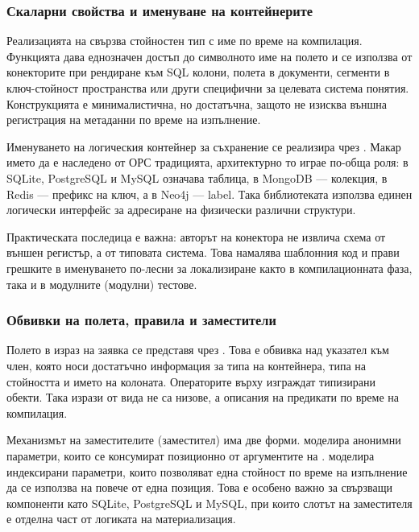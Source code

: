 \subsubsection{Скаларни свойства и именуване на контейнерите}

Реализацията на  свързва стойностен тип с име по време на компилация. Функцията  дава еднозначен достъп до символното име на полето и се използва от конекторите при рендиране към SQL колони, полета в документи, сегменти в ключ-стойност пространства или други специфични за целевата система понятия. Конструкцията е минималистична, но достатъчна, защото не изисква външна регистрация на метаданни по време на изпълнение.

Именуването на логическия контейнер за съхранение се реализира чрез . Макар името да е наследено от ОРС традицията, архитектурно то играе по-обща роля: в SQLite, PostgreSQL и MySQL означава таблица, в MongoDB --- колекция, в Redis --- префикс на ключ, а в Neo4j --- label. Така библиотеката използва единен логически интерфейс за адресиране на физически различни структури.

Практическата последица е важна: авторът на конектора не извлича схема от външен регистър, а от типовата система. Това намалява шаблонния код и прави грешките в именуването по-лесни за локализиране както в компилационната фаза, така и в модулните (модулни) тестове.

\subsubsection{Обвивки на полета, правила и заместители}

Полето в израз на заявка се представя чрез . Това е  обвивка над указател към член, която носи достатъчно информация за типа на контейнера, типа на стойността и името на колоната. Операторите върху  изграждат типизирани  обекти. Така изрази от вида  не са низове, а описания на предикати по време на компилация.

Механизмът на заместителите (заместител) има две форми.  моделира анонимни параметри, които се консумират позиционно от аргументите на .  моделира индексирани параметри, които позволяват една стойност по време на изпълнение да се използва на повече от една позиция. Това е особено важно за свързващи компоненти като SQLite, PostgreSQL и MySQL, при които слотът на заместителя е отделна част от логиката на материализация.


